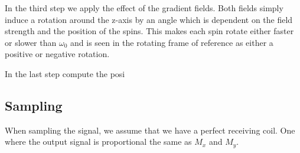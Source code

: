 In the third step we apply the effect of the gradient fields. Both
fields simply induce a rotation around the z-axis by an angle which is
dependent on the field strength and the position of the spins. This
makes each spin rotate either faster or slower than $\omega_0$ and is
seen in the rotating frame of reference as either a positive or
negative rotation. 

In the last step compute the posi








\subsection{Sampling}

When sampling the signal, we assume that we have a perfect receiving
coil. One where the output signal is proportional the same as $M_x$
and $M_y$.

